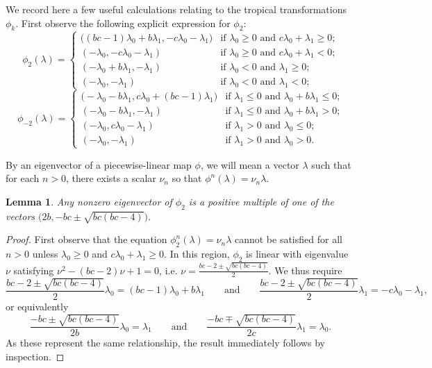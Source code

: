 \documentclass{amsart}
\newtheorem{lemma}[theorem]{Lemma}
\numberwithin{theorem}{section}
\begin{document}
  We record here a few useful calculations relating to the tropical transformations $\phi_k$.
  First observe the following explicit expression for $\phi_2$:
  \begin{equation}
    \label{eq:forward two step mutation}
    \phi_2(\lambda)
    =
    \begin{cases}
      \big((bc-1)\lambda_0+b\lambda_1, -c\lambda_0-\lambda_1\big) & \text{if $\lambda_0\ge 0$ and $c\lambda_0+\lambda_1\ge 0$;}\\
      (-\lambda_0, -c\lambda_0-\lambda_1) & \text{if $\lambda_0\ge 0$ and $c\lambda_0+\lambda_1<0$;}\\
      (-\lambda_0+b\lambda_1, -\lambda_1) & \text{if $\lambda_0<0$ and $\lambda_1\ge 0$;}\\
      (-\lambda_0,-\lambda_1) & \text{if $\lambda_0<0$ and $\lambda_1<0$;}
    \end{cases}
  \end{equation}
  \begin{equation}
    \label{eq:backward two step mutation}
    \phi_{-2}(\lambda)
    =
    \begin{cases}
      \big(-\lambda_0-b\lambda_1, c\lambda_0+(bc-1)\lambda_1\big) & \text{if $\lambda_1\le 0$ and $\lambda_0+b\lambda_1\le 0$;}\\
      (-\lambda_0-b\lambda_1, -\lambda_1) & \text{if $\lambda_1\le 0$ and $\lambda_0+b\lambda_1>0$;}\\
      (-\lambda_0, c\lambda_0-\lambda_1) & \text{if $\lambda_1>0$ and $\lambda_0\le 0$;}\\
      (-\lambda_0,-\lambda_1) & \text{if $\lambda_1>0$ and $\lambda_0>0$.}
    \end{cases}
  \end{equation}

  By an eigenvector of a piecewise-linear map $\phi$, we will mean a vector $\lambda$ such that for each $n>0$, there exists a scalar $\nu_n$ so that $\phi^n(\lambda)=\nu_n\lambda$.
  \begin{lemma}
    Any nonzero eigenvector of $\phi_2$ is a positive multiple of one of the vectors $\big(2b,-bc\pm\sqrt{bc(bc-4)}\big)$.
  \end{lemma}
  \begin{proof}
    First observe that the equation $\phi_2^n(\lambda)=\nu_n\lambda$ cannot be satisfied for all $n>0$ unless $\lambda_0\ge 0$ and $c\lambda_0+\lambda_1\ge 0$.
    In this region, $\phi_2$ is linear with eigenvalue $\nu$ satisfying $\nu^2-(bc-2)\nu+1=0$, i.e. $\nu=\frac{bc-2\pm\sqrt{bc(bc-4)}}{2}$.
    We thus require 
    \[\frac{bc-2\pm\sqrt{bc(bc-4)}}{2}\lambda_0=(bc-1)\lambda_0+b\lambda_1 \qquad\text{and}\qquad \frac{bc-2\pm\sqrt{bc(bc-4)}}{2}\lambda_1= -c\lambda_0-\lambda_1,\]
    or equivalently
    \[\frac{-bc\pm\sqrt{bc(bc-4)}}{2b}\lambda_0=\lambda_1 \qquad\text{and}\qquad \frac{-bc\mp\sqrt{bc(bc-4)}}{2c}\lambda_1=\lambda_0.\]
    As these represent the same relationship, the result immediately follows by inspection.
  \end{proof}
\end{document}
